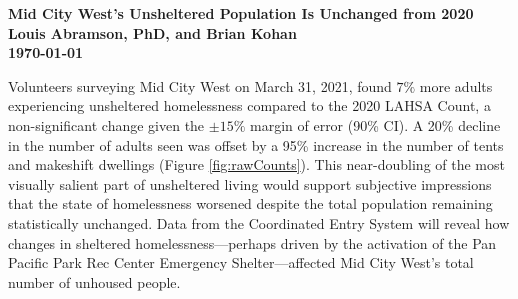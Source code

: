 \documentclass[11pt]{article}
\def\bfr{\bf\color{red}}
\begin{document}

\begin{center}
	\Large\bf Mid City West's Unsheltered Population Is Unchanged from 2020\\
	\vspace{1ex}
	{\normalsize\rm Louis Abramson, PhD, and Brian Kohan\\ \today 
	}%
\end{center}

 Volunteers surveying Mid City West on March 31, 
2021, found $7\%$ more adults experiencing unsheltered homelessness compared to the 2020 
LAHSA Count, a non-significant change given the $\pm15\%$ margin of error (90\% CI). A 20\%
decline in the number of adults seen was offset by a 95\% increase in the number of tents and 
makeshift dwellings (Figure \ref{fig:rawCounts}). This near-doubling of the most visually salient 
part of unsheltered living would support subjective impressions that the state of homelessness 
worsened despite the total population remaining statistically unchanged. Data from the Coordinated 
Entry System will reveal how changes in sheltered homelessness---perhaps driven by the activation 
of the Pan Pacific Park Rec Center Emergency Shelter---affected Mid City West's total number of 
unhoused people.

\begin{table}[h]
\caption{Mid City West 2021 Unsheltered Counts and Population Estimates}
\caption*{*Neither the change in raw counts or inferred population is statistically significant (parentheses 
denote 90\% uncertainties). No transition age youth, minors, or families were sighted.}
\label{tbl:summary}
\end{table}
\end{document}
